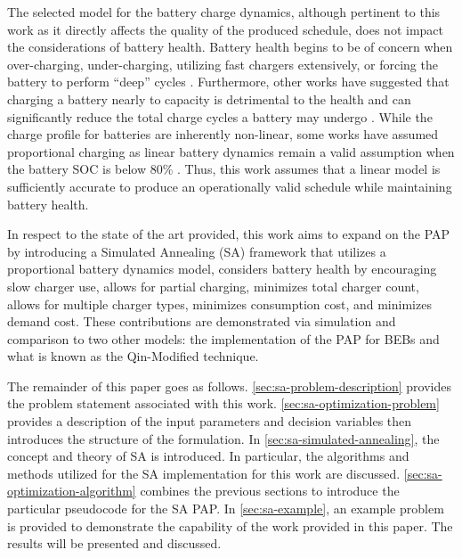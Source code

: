 \documentclass[energies,article,submit,moreauthors]{Definitions/mdpi}
\begin{document}
The selected model for the battery charge dynamics, although pertinent to this work as it directly affects the quality
of the produced schedule, does not impact the considerations of battery health. Battery health begins to be of concern
when over-charging, under-charging, utilizing fast chargers extensively, or forcing the battery to perform ``deep'' cycles
\cite{zhou-2020-bi-objec,millner-2010-model-lithium,edge-2021-lithium}. Furthermore, other works have suggested
that charging a battery nearly to capacity is detrimental to the health and can significantly reduce the total charge
cycles a battery may undergo \cite{edge-2021-lithium,millner-2010-model-lithium}. While the charge profile for
batteries are inherently non-linear, some works have assumed proportional charging as linear battery dynamics remain a
valid assumption when the battery SOC is below 80\% \cite{liu-2020-batter-elect}. Thus, this work assumes that a linear
model is sufficiently accurate to produce an operationally valid schedule while maintaining battery health.

In respect to the state of the art provided, this work aims to expand on the PAP by introducing a Simulated Annealing
(SA) framework that utilizes a proportional battery dynamics model, considers battery health by encouraging slow charger
use, allows for partial charging, minimizes total charger count, allows for multiple charger types, minimizes
consumption cost, and minimizes demand cost. These contributions are demonstrated via simulation and comparison to two
other models: the implementation of the PAP for BEBs and what is known as the Qin-Modified
technique.

The remainder of this paper goes as follows. \ref{sec:sa-problem-description} provides the problem statement associated with
this work. \ref{sec:sa-optimization-problem} provides a description of the input parameters and decision variables then
introduces the structure of the formulation. In \ref{sec:sa-simulated-annealing}, the concept and theory of SA is introduced.
In particular, the algorithms and methods utilized for the SA implementation for this work are discussed.
\ref{sec:sa-optimization-algorithm} combines the previous sections to introduce the particular pseudocode for the SA PAP. In
\ref{sec:sa-example}, an example problem is provided to demonstrate the capability of the work provided in this paper. The
results will be presented and discussed.
\end{document}
